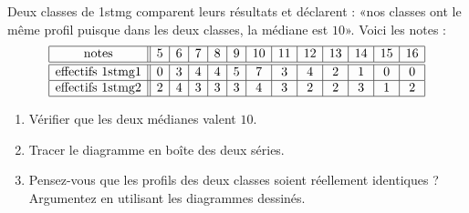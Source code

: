 
\begin{exercice}\label{exosmath-0392}

    Deux classes de 1stmg comparent leurs résultats et déclarent : «nos classes ont le même profil puisque dans les deux classes, la médiane est \( 10\)». Voici les notes :
    \begin{equation*}
        \begin{array}[]{|c||c|c|c|c|c|c|c|c|c|c|c|c|}
            \hline
            \text{notes}&5&6&7&8&9&10&11&12&13&14&15&16\\
            \hline\hline
            \text{effectifs 1stmg1}&0&3&4&4&5&7&3&4&2&1&0&0\\
            \hline
            \text{effectifs 1stmg2}&2&4&3&3&3&4&3&2&2&3&1&2\\
            \hline
        \end{array}
    \end{equation*}
    \begin{enumerate}
        \item
            Vérifier que les deux médianes valent \( 10\).
        \item
            Tracer le diagramme en boîte des deux séries.
        \item
            Pensez-vous que les profils des deux classes soient réellement identiques ? Argumentez en utilisant les diagrammes dessinés.
    \end{enumerate}

\end{exercice}
